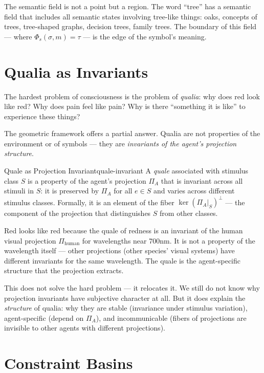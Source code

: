 The semantic field is not a point but a region. The word ``tree'' has
a semantic field that includes all semantic states involving tree-like
things: oaks, concepts of trees, tree-shaped graphs, decision trees,
family trees. The boundary of this field — where $\Phi_s(\sigma, m) = \tau$
— is the edge of the symbol's meaning.

\section{Qualia as Invariants}

The hardest problem of consciousness is the problem of \emph{qualia}:
why does red look like red? Why does pain feel like pain? Why is there
``something it is like'' to experience these things?

The geometric framework offers a partial answer. Qualia are not
properties of the environment or of symbols — they are \emph{invariants
of the agent's projection structure}.

\begin{definition}{Quale as Projection Invariant}{quale-invariant}
  A \emph{quale} associated with stimulus class $S$ is a property of
  the agent's projection $\Pi_A$ that is invariant across all stimuli
  in $S$: it is preserved by $\Pi_A$ for all $e \in S$ and varies
  across different stimulus classes.
  Formally, it is an element of the fiber $\ker(\Pi_A|_S)^\perp$ —
  the component of the projection that distinguishes $S$ from other
  classes.
\end{definition}

Red looks like red because the quale of redness is an invariant of the
human visual projection $\Pi_{\text{human}}$ for wavelengths near 700nm.
It is not a property of the wavelength itself — other projections (other
species' visual systems) have different invariants for the same wavelength.
The quale is the agent-specific structure that the projection extracts.

\begin{remark}
  This does not solve the hard problem — it relocates it. We still do
  not know why projection invariants have subjective character at all.
  But it does explain the \emph{structure} of qualia: why they are
  stable (invariance under stimulus variation), agent-specific (depend
  on $\Pi_A$), and incommunicable (fibers of projections are invisible
  to other agents with different projections).
\end{remark}

\section{Constraint Basins}

